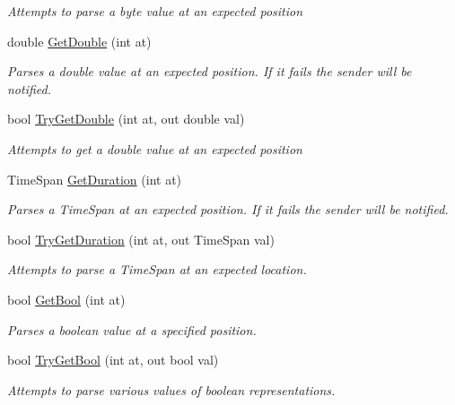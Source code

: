 \begin{DoxyCompactItemize}
\begin{DoxyCompactList}\small\item\em Attempts to parse a byte value at an expected position \end{DoxyCompactList}\item 
double \hyperlink{class_o_t_a_1_1_command_1_1_argument_list_aa8261229d4ba3dfe701bd8be58ffa220}{Get\+Double} (int at)
\begin{DoxyCompactList}\small\item\em Parses a double value at an expected position. If it fails the sender will be notified. \end{DoxyCompactList}\item 
bool \hyperlink{class_o_t_a_1_1_command_1_1_argument_list_ac7e99714c334a38746cc995a6b5f51fd}{Try\+Get\+Double} (int at, out double val)
\begin{DoxyCompactList}\small\item\em Attempts to get a double value at an expected position \end{DoxyCompactList}\item 
Time\+Span \hyperlink{class_o_t_a_1_1_command_1_1_argument_list_a89d41e06da800bf3b91e4f945c4cf2d7}{Get\+Duration} (int at)
\begin{DoxyCompactList}\small\item\em Parses a Time\+Span at an expected position. If it fails the sender will be notified. \end{DoxyCompactList}\item 
bool \hyperlink{class_o_t_a_1_1_command_1_1_argument_list_a913c63bc28998a353af03d5586be458e}{Try\+Get\+Duration} (int at, out Time\+Span val)
\begin{DoxyCompactList}\small\item\em Attempts to parse a Time\+Span at an expected location. \end{DoxyCompactList}\item 
bool \hyperlink{class_o_t_a_1_1_command_1_1_argument_list_a35f3e5cd80f44cc904d8c38c4b351c76}{Get\+Bool} (int at)
\begin{DoxyCompactList}\small\item\em Parses a boolean value at a specified position. \end{DoxyCompactList}\item 
bool \hyperlink{class_o_t_a_1_1_command_1_1_argument_list_a411bbc9c74748a725a1db03d6e575bf3}{Try\+Get\+Bool} (int at, out bool val)
\begin{DoxyCompactList}\small\item\em Attempts to parse various values of boolean representations. \end{DoxyCompactList}\item 

\end{DoxyCompactItemize}
